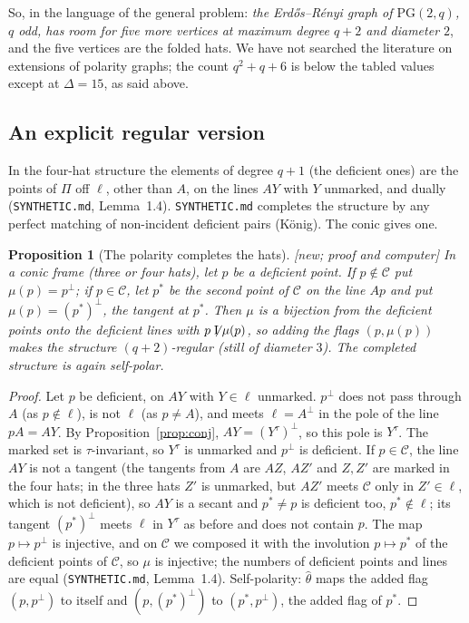 \documentclass[11pt]{amsart}
\newtheorem{proposition}[theorem]{Proposition}
\theoremstyle{definition}
\theoremstyle{remark}
\newcommand{\nI}{\mathrel{\not\mathrel{\mathrm{I}}}}
\newcommand{\cC}{\mathcal{C}}
\newcommand{\PG}{\mathrm{PG}}
\newcommand{\status}[1]{\textup{[#1]}}
\begin{document}
So, in the language of the general problem: \emph{the Erd\H{o}s--R\'enyi graph of $\PG(2,q)$, $q$ odd, has room for
five more vertices at maximum degree $q+2$ and diameter $2$}, and the five vertices are the folded hats. We have not
searched the literature on extensions of polarity graphs; the count $q^2+q+6$ is below the tabled values except at
$\Delta=15$, as said above.

\subsection{An explicit regular version}
In the four-hat structure the elements of degree $q+1$ (the deficient ones) are the points of $\Pi$ off $\ell$,
other than $A$, on the lines $AY$ with $Y$ unmarked, and dually (\texttt{SYNTHETIC.md}, Lemma~1.4). \texttt{SYNTHETIC.md}
completes the structure by any perfect matching of non-incident deficient pairs (K\"onig). The conic gives one.

\begin{proposition}[The polarity completes the hats]\label{prop:complete}
\status{new; proof and computer} In a conic frame (three or four hats), let $p$ be a deficient point. If $p\notin\cC$
put $\mu(p)=p^\perp$; if $p\in\cC$, let $p^*$ be the second point of $\cC$ on the line $Ap$ and put
$\mu(p)=(p^*)^\perp$, the tangent at $p^*$. Then $\mu$ is a bijection from the deficient points onto the deficient
lines with $p\nI\mu(p)$, so adding the flags $(p,\mu(p))$ makes the structure $(q+2)$-regular (still of diameter
$3$). The completed structure is again self-polar.
\end{proposition}
\begin{proof}
Let $p$ be deficient, on $AY$ with $Y\in\ell$ unmarked. $p^\perp$ does not pass through $A$ (as $p\notin\ell$), is not
$\ell$ (as $p\ne A$), and meets $\ell=A^\perp$ in the pole of the line $pA=AY$. By Proposition~\ref{prop:conj},
$AY=(Y^\tau)^\perp$, so this pole is $Y^\tau$. The marked set is $\tau$-invariant, so $Y^\tau$ is unmarked and $p^\perp$ is
deficient. If $p\in\cC$, the line $AY$ is not a tangent (the tangents from $A$ are $AZ$, $AZ'$ and $Z,Z'$ are marked
in the four hats; in the three hats $Z'$ is unmarked, but $AZ'$ meets $\cC$ only in $Z'\in\ell$, which is not
deficient), so $AY$ is a secant and $p^*\ne p$ is deficient too, $p^*\notin\ell$; its tangent $(p^*)^\perp$ meets
$\ell$ in $Y^\tau$ as before and does not contain $p$. The map $p\mapsto p^\perp$ is injective, and on $\cC$ we
composed it with the involution $p\mapsto p^*$ of the deficient points of $\cC$, so $\mu$ is injective; the numbers
of deficient points and lines are equal (\texttt{SYNTHETIC.md}, Lemma~1.4). Self-polarity: $\hat\theta$ maps the added flag $(p,p^\perp)$ to itself and
$(p,(p^*)^\perp)$ to $(p^*,p^\perp)$, the added flag of $p^*$.
\end{proof}
\end{document}
